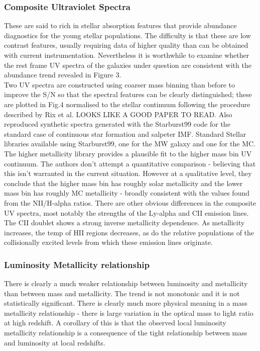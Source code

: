\documentclass{literature}
\begin{document}
\subsubsection{Composite Ultraviolet Spectra}
These are said to rich in stellar absorption features that provide abundance diagnostics for the young stellar populations. The difficulty is that these are low contrast features, usually requiring data of higher quality than can be obtained with current instrumentation. Nevertheless it is worthwhile to examine whether the rest frame UV spectra of the galaxies under question are consistent with the abundance trend revealed in Figure 3. \\
Two UV spectra are constructed using coarser mass binning than before to improve the S/N so that the spectral features can be clearly distinguished; these are plotted in Fig.4 normalised to the stellar continuum following the procedure described by Rix et al. \citep{Rix_2004} LOOKS LIKE A GOOD PAPER TO READ. Also reproduced synthetic spectra generated with the Starburst99 code \citep{Leitherer_1999} for the standard case of continuous star formation and salpeter IMF. Standard Stellar libraries available using Starburst99, one for the MW galaxy and one for the MC. The higher metallicity library provides a plausible fit to the higher mass bin UV continuum. The authors don't attempt a quantitative comparison - believing that this isn't warranted in the current situation. However at a qualitative level, they conclude that the higher mass bin has roughly solar metallicity and the lower mass bin has roughly MC metallicity - broadly consistent with the values found from the NII/H-alpha ratios. There are other obvious differences in the composite UV spectra, most notably the strengths of the Ly-alpha and CII emission lines. The CII doublet shows a strong inverse metallicity dependence. As metallicity increases, the temp of HII regions decreases, as do the relative populations of the collisionally excited levels from which these emission lines originate. 
\subsubsection{Luminosity Metallicity relationship}
There is clearly a much weaker relationship between luminosity and metallicity than between mass and metallicity. The trend is not monotonic and it is not statistically significant. There is clearly much more physical meaning in a mass metallicity relationship - there is large variation in the optical mass to light ratio at high redshift. A corollary of this is that the observed local luminosity metallicity relationship is a consequence of the tight relationship between mass and luminosity at local redshifts. 
\end{document}
